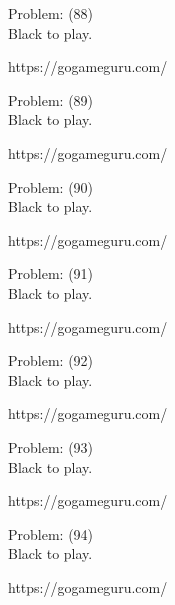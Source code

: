 \documentclass[11pt]{article}
\begin{document}
\begin{minipage}[t]{0.5\textwidth}
  {\centering
  
  Problem: (88)\\
  Black to play.

https://gogameguru.com/\\
  }
\end{minipage}
\begin{minipage}[t]{0.5\textwidth}
  {\centering
  
  Problem: (89)\\
  Black to play.

https://gogameguru.com/\\
  }
\end{minipage}
\begin{minipage}[t]{0.5\textwidth}
  {\centering
  
  Problem: (90)\\
  Black to play.

https://gogameguru.com/\\
  }
\end{minipage}
\begin{minipage}[t]{0.5\textwidth}
  {\centering
  
  Problem: (91)\\
  Black to play.

https://gogameguru.com/\\
  }
\end{minipage}
\begin{minipage}[t]{0.5\textwidth}
  {\centering
  
  Problem: (92)\\
  Black to play.

https://gogameguru.com/\\
  }
\end{minipage}
\begin{minipage}[t]{0.5\textwidth}
  {\centering
  
  Problem: (93)\\
  Black to play.

https://gogameguru.com/\\
  }
\end{minipage}
\begin{minipage}[t]{0.5\textwidth}
  {\centering
  
  Problem: (94)\\
  Black to play.

https://gogameguru.com/\\
  }
\end{minipage}
\end{document}
